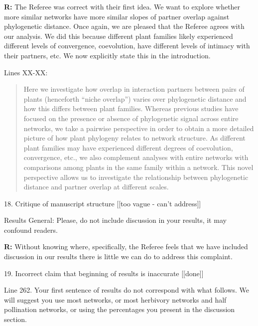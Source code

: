 \documentclass[12pt]{letter}
\newenvironment{refquote}{\bigskip \begin{it}}{\end{it}\smallskip}
\begin{document}
		\textbf{R:} The Referee was correct with their first idea. We want to explore whether more similar networks have more similar slopes of partner overlap against phylogenetic distance. Once again, we are pleased that the Referee agrees with our analysis. We did this because different plant families likely experienced different levels of convergence, coevolution, have different levels of intimacy with their partners, etc. We now explicitly state this in the introduction.


		Lines XX-XX:

		\begin{quotation}

		  Here we investigate how overlap in interaction partners between 
		  pairs of plants (henceforth ``niche overlap'') varies over 
		  phylogenetic distance and how this differs between plant families. 
		  Whereas previous 
		  studies have focused on the presence or absence of phylogenetic
		  signal across entire networks, we take a pairwise perspective in
		  order to obtain a more detailed picture of how plant phylogeny
		  relates to network structure. As different plant families may have experienced different degrees of coevolution, convergence, etc., we also complement analyses with entire networks with comparisons among plants in the same family within a network. 
		  This novel perspective allows us to investigate the relationship between phylogenetic distance and partner overlap at different scales. 

  		\end{quotation}


	18. Critique of manuscript structure [[too vague - can't address]]

		\begin{refquote}
			Results
			General: Please, do not include discussion in your results, it may confound readers.
		\end{refquote}

		\textbf{R:} Without knowing where, specifically, the Referee feels that we have included discussion in our results there is little we can do to address this complaint.


	19. Incorrect claim that beginning of results is inaccurate [[done]]

		\begin{refquote}
			Line 262. Your first sentence of results do not correspond with what follows. We will suggest you use most networks, or most herbivory networks and half pollination networks, or using the percentages you present in the discussion section.
		\end{refquote}
\end{document}

